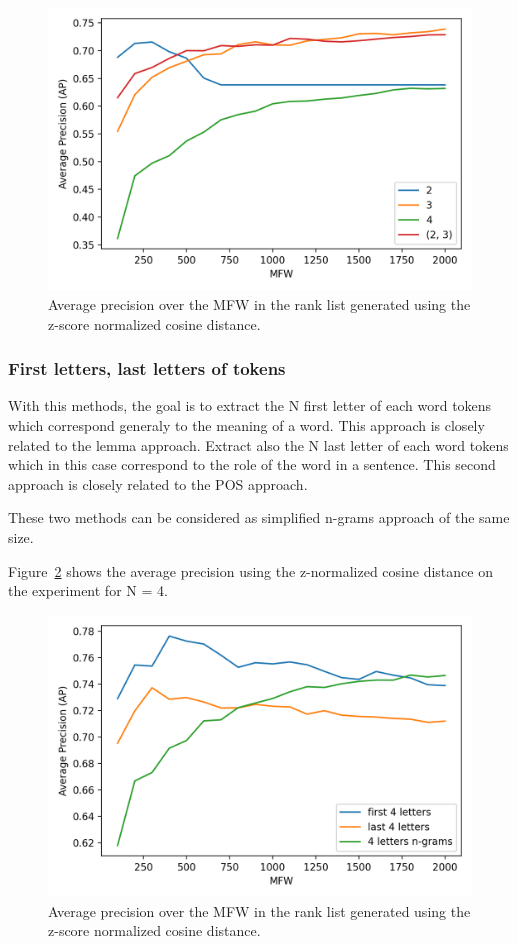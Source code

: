 \begin{figure}
  \includegraphics[width=\linewidth]{img/pos_ngrams.png}
  \caption{Average precision over the MFW in the rank list generated using the z-score normalized cosine distance.}
  \label{fig:pos_ngrams}
\end{figure}

\subsubsection{First letters, last letters of tokens}

With this methods, the goal is to extract the N first letter of each word tokens which correspond generaly to the meaning of a word.
This approach is closely related to the lemma approach.
Extract also the N last letter of each word tokens which in this case correspond to the role of the word in a sentence.
This second approach is closely related to the POS approach.

These two methods can be considered as simplified n-grams approach of the same size.

Figure~\ref{fig:first_last_letters_ngrams} shows the average precision using the z-normalized cosine distance on the experiment for N = 4.

\begin{figure}
  \includegraphics[width=\linewidth]{img/first_last_letters_ngrams.png}
  \caption{Average precision over the MFW in the rank list generated using the z-score normalized cosine distance.}
  \label{fig:first_last_letters_ngrams}
\end{figure}


